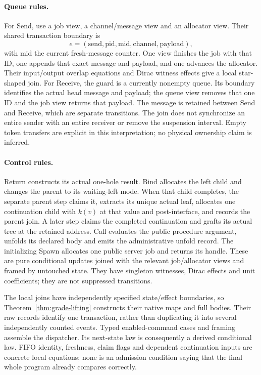 \documentclass[11pt]{article}
\begin{document}
\paragraph{Queue rules.} For Send, use a job view, a channel/message view and an allocator view. Their shared transaction boundary is
\[
 e=(\mathrm{send},\mathrm{pid},\mathrm{mid},\mathrm{channel},\mathrm{payload}),
\]
with $\mathrm{mid}$ the current fresh-message counter. One view finishes the job with that ID, one appends that exact message and payload, and one advances the allocator. Their input/output overlap equations and Dirac witness effects give a local star-shaped join. For Receive, the guard is a currently nonempty queue. Its boundary identifies the actual head message and payload; the queue view removes that one ID and the job view returns that payload. The message is retained between Send and Receive, which are separate transitions. The join does not synchronize an entire sender with an entire receiver or remove the suspension interval. Empty token transfers are explicit in this interpretation; no physical ownership claim is inferred.

\paragraph{Control rules.} Return constructs its actual one-hole result. Bind allocates the left child and changes the parent to its waiting-left mode. When that child completes, the separate parent step claims it, extracts its unique actual leaf, allocates one continuation child with $k(v)$ at that value and post-interface, and records the parent join. A later step claims the completed continuation and grafts its actual tree at the retained address. Call evaluates the public procedure argument, unfolds its declared body and emits the administrative unfold record. The initializing Spawn allocates one public server job and returns its handle. These are pure conditional updates joined with the relevant job/allocator views and framed by untouched state. They have singleton witnesses, Dirac effects and unit coefficients; they are not suppressed transitions.

The local joins have independently specified state/effect boundaries, so Theorem~\ref{thm:grade-lifting} constructs their native maps and full bodies. Their raw records identify one transaction, rather than duplicating it into several independently counted events. Typed enabled-command cases and framing assemble the dispatcher. Its next-state law is consequently a derived conditional law. FIFO identity, freshness, claim flags and dependent continuation inputs are concrete local equations; none is an admission condition saying that the final whole program already compares correctly.
\end{document}
